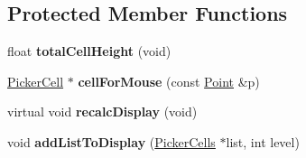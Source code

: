 \subsection*{Protected Member Functions}
\begin{DoxyCompactItemize}
\item 
float {\bfseries total\+Cell\+Height} (void)\hypertarget{classPicker_a096dbead02718291d6db28809acc5b6c}{}\label{classPicker_a096dbead02718291d6db28809acc5b6c}

\item 
\hyperlink{classPickerCell}{Picker\+Cell} $\ast$ {\bfseries cell\+For\+Mouse} (const \hyperlink{classPoint}{Point} \&p)\hypertarget{classPicker_a050b1895ac3495dd4053868f96215cb3}{}\label{classPicker_a050b1895ac3495dd4053868f96215cb3}

\item 
virtual void {\bfseries recalc\+Display} (void)\hypertarget{classPicker_a1bf1c9aed9aa1b297d6f676f485c0e1e}{}\label{classPicker_a1bf1c9aed9aa1b297d6f676f485c0e1e}

\item 
void {\bfseries add\+List\+To\+Display} (\hyperlink{classPickerCells}{Picker\+Cells} $\ast$list, int level)\hypertarget{classPicker_a754ade23cc1f993ab83f39b087dc14a7}{}\label{classPicker_a754ade23cc1f993ab83f39b087dc14a7}

\end{DoxyCompactItemize}
